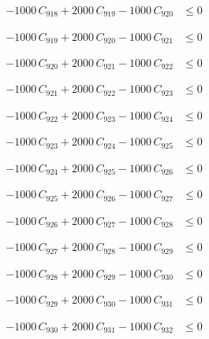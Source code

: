 \documentclass[a4paper,11pt]{article}
\begin{document}
\begin{align}
-1000\,C_{918} + 2000\,C_{919} - 1000\,C_{920} &\leq 0 \nonumber
\end{align}

\begin{align}
-1000\,C_{919} + 2000\,C_{920} - 1000\,C_{921} &\leq 0 \nonumber
\end{align}

\begin{align}
-1000\,C_{920} + 2000\,C_{921} - 1000\,C_{922} &\leq 0 \nonumber
\end{align}

\begin{align}
-1000\,C_{921} + 2000\,C_{922} - 1000\,C_{923} &\leq 0 \nonumber
\end{align}

\begin{align}
-1000\,C_{922} + 2000\,C_{923} - 1000\,C_{924} &\leq 0 \nonumber
\end{align}

\begin{align}
-1000\,C_{923} + 2000\,C_{924} - 1000\,C_{925} &\leq 0 \nonumber
\end{align}

\begin{align}
-1000\,C_{924} + 2000\,C_{925} - 1000\,C_{926} &\leq 0 \nonumber
\end{align}

\begin{align}
-1000\,C_{925} + 2000\,C_{926} - 1000\,C_{927} &\leq 0 \nonumber
\end{align}

\begin{align}
-1000\,C_{926} + 2000\,C_{927} - 1000\,C_{928} &\leq 0 \nonumber
\end{align}

\begin{align}
-1000\,C_{927} + 2000\,C_{928} - 1000\,C_{929} &\leq 0 \nonumber
\end{align}

\begin{align}
-1000\,C_{928} + 2000\,C_{929} - 1000\,C_{930} &\leq 0 \nonumber
\end{align}

\begin{align}
-1000\,C_{929} + 2000\,C_{930} - 1000\,C_{931} &\leq 0 \nonumber
\end{align}

\begin{align}
-1000\,C_{930} + 2000\,C_{931} - 1000\,C_{932} &\leq 0 \nonumber
\end{align}
\end{document}
